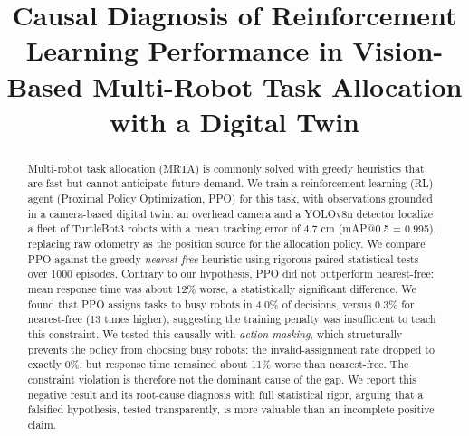 \documentclass[conference]{IEEEtran}
\begin{document}
\title{Causal Diagnosis of Reinforcement Learning Performance in Vision-Based Multi-Robot Task Allocation with a Digital Twin}

\author{
\and
{}
}

\maketitle

\begin{abstract}
Multi-robot task allocation (MRTA) is commonly solved with greedy heuristics that are fast but cannot anticipate future demand. We train a reinforcement learning (RL) agent (Proximal Policy Optimization, PPO) for this task, with observations grounded in a camera-based digital twin: an overhead camera and a YOLOv8n detector localize a fleet of TurtleBot3 robots with a mean tracking error of 4.7 cm (mAP@0.5 = 0.995), replacing raw odometry as the position source for the allocation policy. We compare PPO against the greedy \textit{nearest-free} heuristic using rigorous paired statistical tests over 1000 episodes. Contrary to our hypothesis, PPO did not outperform nearest-free: mean response time was about 12\% worse, a statistically significant difference. We found that PPO assigns tasks to busy robots in 4.0\% of decisions, versus 0.3\% for nearest-free (13 times higher), suggesting the training penalty was insufficient to teach this constraint. We tested this causally with \textit{action masking}, which structurally prevents the policy from choosing busy robots: the invalid-assignment rate dropped to exactly 0\%, but response time remained about 11\% worse than nearest-free. The constraint violation is therefore not the dominant cause of the gap. We report this negative result and its root-cause diagnosis with full statistical rigor, arguing that a falsified hypothesis, tested transparently, is more valuable than an incomplete positive claim.
\end{abstract}
\end{document}
